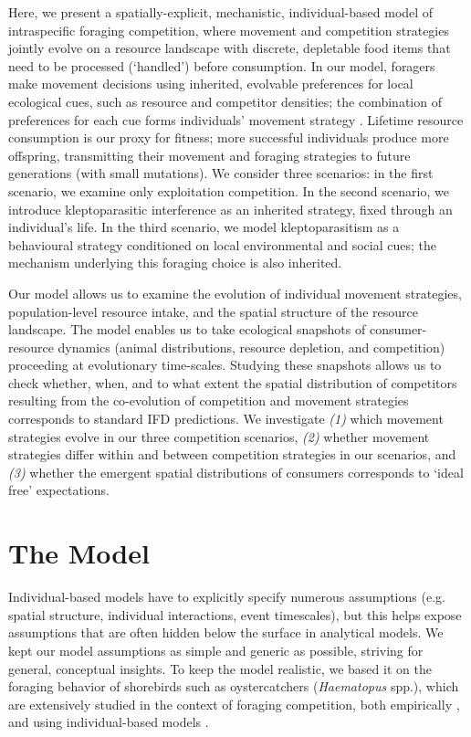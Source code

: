 Here, we present a spatially-explicit, mechanistic, individual-based model of intraspecific foraging competition, where movement and competition strategies jointly evolve on a resource landscape with discrete, depletable food items that need to be processed (`handled') before consumption.
In our model, foragers make movement decisions using inherited, evolvable preferences for local ecological cues, such as resource and competitor densities; the combination of preferences for each cue forms individuals' movement strategy \citep[similar to relative step-selection:][]{fortin2005, avgar2016}.
Lifetime resource consumption is our proxy for fitness; more successful individuals produce more offspring, transmitting their movement and foraging strategies to future generations (with small mutations).
We consider three scenarios: in the first scenario, we examine only exploitation competition.
In the second scenario, we introduce kleptoparasitic interference as an inherited strategy, fixed through an individual's life.
In the third scenario, we model kleptoparasitism as a behavioural strategy conditioned on local environmental and social cues; the mechanism underlying this foraging choice is also inherited.

Our model allows us to examine the evolution of individual movement strategies, population-level resource intake, and the spatial structure of the resource landscape.
The model enables us to take ecological snapshots of consumer-resource dynamics (animal distributions, resource depletion, and competition) proceeding at evolutionary time-scales.
Studying these snapshots allows us to check whether, when, and to what extent the spatial distribution of competitors resulting from the co-evolution of competition and movement strategies corresponds to standard IFD predictions.
We investigate \textit{(1)} which movement strategies evolve in our three competition scenarios, \textit{(2)} whether movement strategies differ within and between competition strategies in our scenarios, and \textit{(3)} whether the emergent spatial distributions of consumers corresponds to `ideal free' expectations.

\section*{The Model}

Individual-based models have to explicitly specify numerous assumptions (e.g. spatial structure, individual interactions, event timescales), but this helps expose assumptions that are often hidden below the surface in analytical models. 
We kept our model assumptions as simple and generic as possible, striving for general, conceptual insights.
To keep the model realistic, we based it on the foraging behavior of shorebirds such as oystercatchers (\textit{Haematopus} spp.), which are extensively studied in the context of foraging competition, both empirically \citep[e.g.][]{vahl2005, vahl2005a,vahl2007, rutten2010, rutten2010a}, and using individual-based models \citep[reviewed in][]{stillman2010}.

